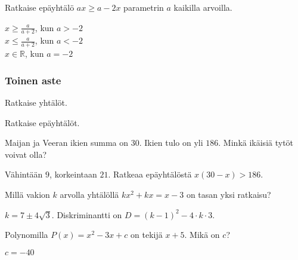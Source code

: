 \begin{tehtavasivu}
\begin{tehtava} 
Ratkaise epäyhtälö $ax \geq a-2x$ parametrin $a$ kaikilla arvoilla.
    \begin{vastaus}
        $x \geq \frac{a}{a+2}$, kun $a > -2$ \\
        $x \leq \frac{a}{a+2}$, kun $a < -2$ \\
    $x \in \mathbb{R}$, kun $a = -2$ \\
	\end{vastaus}
\end{tehtava}

\subsubsection*{Toinen aste}

\begin{tehtava} 
Ratkaise yhtälöt.
    \begin{vastaus}
    \end{vastaus}
\end{tehtava}

\begin{tehtava} 
Ratkaise epäyhtälöt.
    \begin{vastaus}
    \end{vastaus}
\end{tehtava}

\begin{tehtava} 
Maijan ja Veeran ikien summa on $30$. Ikien tulo on yli $186$. Minkä ikäisiä tytöt voivat olla?
    \begin{vastaus}
	Vähintään $9$, korkeintaan $21$. Ratkeaa epäyhtälöstä $x(30-x)>186$.
	\end{vastaus}
\end{tehtava}

\begin{tehtava} 
Millä vakion $k$ arvolla yhtälöllä $kx^2+kx=x-3$ on tasan yksi ratkaisu?
    \begin{vastaus}
		$k = 7 \pm 4 \sqrt{3}$. Diskriminantti on $D = (k-1)^2-4\cdot k \cdot 3$.
    \end{vastaus}
\end{tehtava}

\begin{tehtava} 
Polynomilla $P(x)=x^2-3x+c$ on tekijä $x+5$. Mikä on $c$?
    \begin{vastaus}
		$c=-40$
    \end{vastaus}
\end{tehtava}


\end{tehtavasivu}

